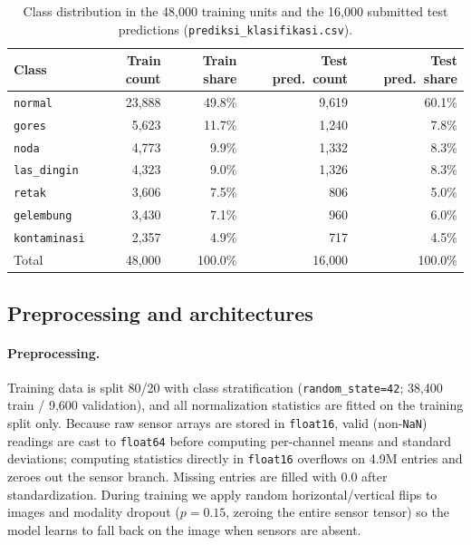 \begin{table}[t]
  \centering
  \caption{Class distribution in the 48{,}000 training units and the 16{,}000 submitted test
  predictions (\texttt{prediksi\_klasifikasi.csv}).}
  \label{tab:t1-dist}
  \small
  \begin{tabular}{lrrrr}
    \toprule
    Class & Train count & Train share & Test pred.\ count & Test pred.\ share \\
    \midrule
    \texttt{normal}      & 23{,}888 & 49.8\% & 9{,}619 & 60.1\% \\
    \texttt{gores}       &  5{,}623 & 11.7\% & 1{,}240 &  7.8\% \\
    \texttt{noda}        &  4{,}773 &  9.9\% & 1{,}332 &  8.3\% \\
    \texttt{las\_dingin} &  4{,}323 &  9.0\% & 1{,}326 &  8.3\% \\
    \texttt{retak}       &  3{,}606 &  7.5\% &   806   &  5.0\% \\
    \texttt{gelembung}   &  3{,}430 &  7.1\% &   960   &  6.0\% \\
    \texttt{kontaminasi} &  2{,}357 &  4.9\% &   717   &  4.5\% \\
    \midrule
    Total                & 48{,}000 & 100.0\% & 16{,}000 & 100.0\% \\
    \bottomrule
  \end{tabular}
\end{table}

\subsection{Preprocessing and architectures}
\label{sec:t1-arch}

\paragraph{Preprocessing.} Training data is split 80/20 with class stratification
(\texttt{random\_state=42}; 38{,}400 train / 9{,}600 validation), and all normalization statistics
are fitted on the training split only. Because raw sensor arrays are stored in \texttt{float16},
valid (non-\texttt{NaN}) readings are cast to \texttt{float64} before computing per-channel means
and standard deviations; computing statistics directly in \texttt{float16} overflows on 4.9M entries
and zeroes out the sensor branch. Missing entries are filled with 0.0 after standardization. During
training we apply random horizontal/vertical flips to images and modality dropout ($p=0.15$, zeroing
the entire sensor tensor) so the model learns to fall back on the image when sensors are absent.

